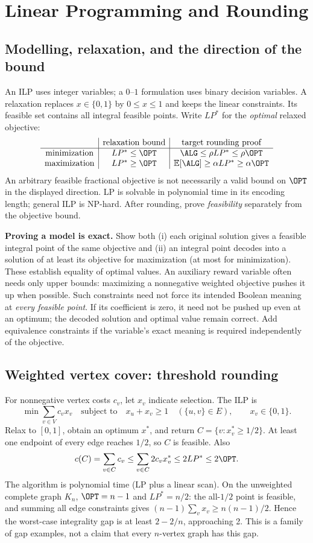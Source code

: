 \section{Linear Programming and Rounding}\label{lp:main}

\subsection{Modelling, relaxation, and the direction of the bound}\label{lp:template}
An ILP uses integer variables; a $0$--$1$ formulation uses binary decision
variables. A relaxation replaces $x\in\{0,1\}$ by $0\le x\le1$ and keeps
the linear constraints. Its feasible set contains all integral feasible
points. Write $LP^*$ for the \emph{optimal} relaxed objective:
\[
  \begin{array}{c|c|c}
    &\text{relaxation bound}&\text{target rounding proof}\\\hline
    \text{minimization}&LP^*\le\OPT&\ALG\le\rho LP^*\le\rho\OPT\\
    \text{maximization}&LP^*\ge\OPT&
       \mathbb E[\ALG]\ge\alpha LP^*\ge\alpha\OPT
  \end{array}
\]
An arbitrary feasible fractional objective is not necessarily a valid bound
on $\OPT$ in the displayed direction. LP is solvable in polynomial time in
its encoding length; general ILP is NP-hard. After rounding, prove
\emph{feasibility} separately from the objective bound.

\textbf{Proving a model is exact.}
Show both (i) each original solution gives a feasible integral point of the
same objective and (ii) an integral point decodes into a solution of at least
its objective for maximization (at most for minimization). These establish
equality of optimal values. An auxiliary reward variable often needs only
upper bounds: maximizing a nonnegative weighted objective pushes it up when
possible. Such constraints need not force its intended Boolean meaning at
\emph{every feasible point}. If its coefficient is zero, it need not be
pushed up even at an optimum; the decoded solution and optimal value remain
correct. Add equivalence constraints if the variable's exact meaning is
required independently of the objective.

\subsection{Weighted vertex cover: threshold rounding}\label{lp:vc}
For nonnegative vertex costs $c_v$, let $x_v$ indicate selection. The ILP is
\[
  \min\sum_{v\in V}c_vx_v
  \quad\text{subject to}\quad
  x_u+x_v\ge1\quad(\{u,v\}\in E),\qquad x_v\in\{0,1\}.
\]
Relax to $[0,1]$, obtain an optimum $x^*$, and return
$C=\{v:x_v^*\ge1/2\}$. At least one endpoint of every edge reaches $1/2$,
so $C$ is feasible. Also
\[
  c(C)=\sum_{v\in C}c_v
    \le\sum_{v\in C}2c_vx_v^*
    \le2LP^*\le2\OPT.
\]
The algorithm is polynomial time (LP plus a linear scan).
On the unweighted complete graph $K_n$, $\OPT=n-1$ and $LP^*=n/2$:
the all-$1/2$ point is feasible, and summing all edge constraints gives
$(n-1)\sum_vx_v\ge n(n-1)/2$. Hence the worst-case integrality gap is
at least $2-2/n$, approaching 2. This is a family of gap examples, not a
claim that every $n$-vertex graph has this gap.

